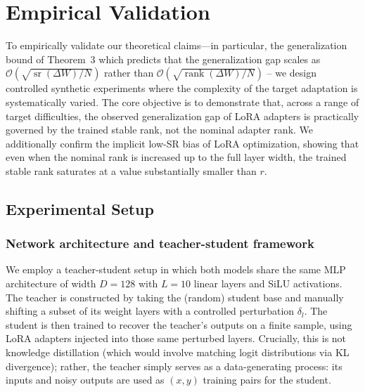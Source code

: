\documentclass[a4paper,14pt]{extarticle}
\DeclareMathOperator{\rank}{rank}
\DeclareMathOperator{\sr}{sr}
\begin{document}
    \section{Empirical Validation}
    
    To empirically validate our theoretical claims---in particular, the generalization bound of Theorem~3 which predicts that the generalization gap scales as $\mathcal{O}(\sqrt{\sr(\Delta W)/N})$ rather than $\mathcal{O}(\sqrt{\rank(\Delta W)/N})$ -- we design controlled synthetic experiments where the complexity of the target adaptation is systematically varied. The core objective is to demonstrate that, across a range of target difficulties, the observed generalization gap of LoRA adapters is practically governed by the trained stable rank, not the nominal adapter rank. We additionally confirm the implicit low-SR bias of LoRA optimization, showing that even when the nominal rank is increased up to the full layer width, the trained stable rank saturates at a value substantially smaller than $r$.


    \subsection{Experimental Setup}

    \subsubsection*{Network architecture and teacher-student framework}

    We employ a teacher-student setup in which both models share the same MLP architecture of width $D=128$ with $L=10$ linear layers and SiLU activations. The teacher is constructed by taking the (random) student base and manually shifting a subset of its weight layers with a controlled perturbation $\delta_l$. The student is then trained to recover the teacher's outputs on a finite sample, using LoRA adapters injected into those same perturbed layers. Crucially, this is not knowledge distillation (which would involve matching logit distributions via KL divergence); rather, the teacher simply serves as a data-generating process: its inputs and noisy outputs are used as $(x, y)$ training pairs for the student. 
\end{document}
